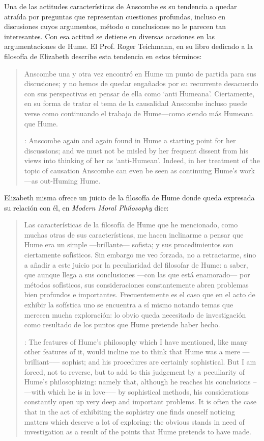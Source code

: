 Una de las actitudes características de Anscombe es su tendencia a quedar atraída por preguntas que representan cuestiones profundas, incluso en discusiones cuyos argumentos, método o conclusiones no le parecen tan interesantes. Con esa actitud se detiene en diversas ocasiones en las argumentaciones de Hume. El Prof. Roger Teichmann, en su libro dedicado a la filosofía de Elizabeth describe esta tendencia en estos términos: \blockquote[{\cite[177]{teichmann}}: Anscombe again and again found in Hume a starting point for her discussions; and we must not be misled by her frequent dissent from his views into thinking of her as `anti-Humean'. Indeed, in her treatment of the topic of causation Anscombe can even be seen as continuing Hume's work---as out-Huming Hume.]{Anscombe una y otra vez encontró en Hume un punto de partida para sus discusiones; y no hemos de quedar engañados por su recurrente desacuerdo con sus perspectivas en pensar de ella como `anti Humeana'. Ciertamente, en su forma de tratar el tema de la causalidad Anscombe incluso puede verse como continuando el trabajo de Hume---como siendo más Humeana que Hume.} Elizabeth misma ofrece un juicio de la filosofía de Hume donde queda expresada su relación con él, en \emph{Modern Moral Philosophy} dice: \blockquote[{\cite[172]{anscombe1981mmph}}: The features of Hume’s philosophy which I have mentioned, like many other features of it, would incline me to think that Hume was a mere ---brilliant--— sophist; and his procedures are certainly sophistical. But I am forced, not to reverse, but to add to this judgement by a peculiarity of Hume’s philosophizing: namely that, although he reaches his conclusions --—with which he is in love--— by sophistical methods, his considerations constantly open up very deep and important problems. It is often the case that in the act of exhibiting the sophistry one finds oneself noticing matters which deserve a lot of exploring: the obvious stands in need of investigation as a result of the points that Hume pretends to have made.]{Las características de la filosofía de Hume que he mencionado, como muchas otras de sus características, me hacen inclinarme a pensar que Hume era un simple ---brillante--- sofista; y sus procedimientos son ciertamente sofísticos. Sin embargo me veo forzada, no a retractarme, sino a añadir a este juicio por la peculiaridad del filosofar de Hume: a saber, que aunque llega a sus conclusiones ---con las que está enamorado--- por métodos sofísticos, sus consideraciones constantemente abren problemas bien profundos e importantes. Frecuentemente es el caso que en el acto de exhibir la sofística uno se encuentra a sí mismo notando temas que merecen mucha exploración: lo obvio queda necesitado de investigación como resultado de los puntos que Hume pretende haber hecho.}

